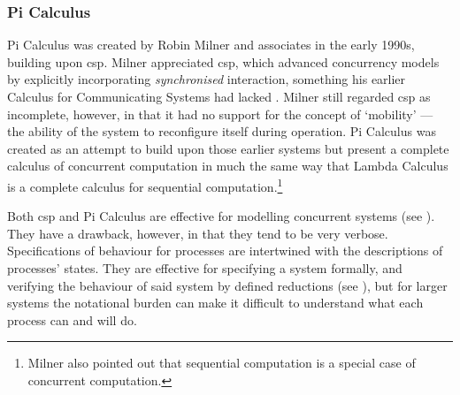 \subsubsection{Pi Calculus}
Pi Calculus was created by Robin Milner and associates in the early 1990s, building upon \gls{csp}.  Milner appreciated \gls{csp}, which advanced concurrency models by explicitly incorporating \emph{synchronised} interaction, something his earlier Calculus for Communicating Systems \cite{Milner1980} had lacked  \cite{Milner1993}.  Milner still regarded \gls{csp} as incomplete, however, in that it had no support for the concept of `mobility' --- \ie{} the ability of the system to reconfigure itself during operation.  Pi Calculus was created as an attempt to build upon those earlier systems but present a complete calculus of concurrent computation in much the same way that Lambda Calculus \cite{Barendregt1984} is a complete calculus for sequential computation.\footnote{Milner also pointed out that sequential computation is a special case of concurrent computation.}

Both \gls{csp} and Pi Calculus are effective for modelling concurrent systems (see \eg{} \cite{Roscoe2011}).  They have a drawback, however, in that they tend to be very verbose.  Specifications of behaviour for processes are intertwined with the descriptions of processes' states.  They are effective for specifying a system formally, and verifying the behaviour of said system by defined reductions (see \eg{} \cite[Ch.~3.2]{Varela2013}), but for larger systems the notational burden can make it difficult to understand what each process can and will do.

